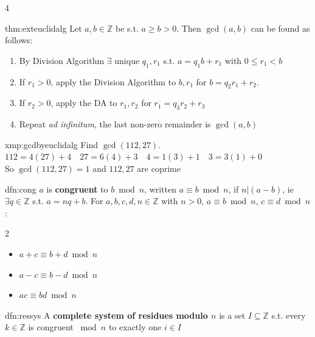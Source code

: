 \documentclass[landscape, 8pt]{extarticle}
\begin{document}
\begin{multicols*}{4}
		
		\begin{thm}{thm:exteuclidalg}{ }
			Let $a, b\in \mathbb{Z}$ be s.t. $a \ge b > 0$. Then $\gcd(a, b)$ can be found as follows:\\
			\begin{enumerate}[label=(\arabic*)]
				\item By Division Algorithm $\exists$ unique $q_1, r_1$ s.t. $a = q_1b + r_1$ with $0 \le r_1 < b$
				\item If $r_1 > 0$, apply the Division Algorithm to $b, r_1$ for $b = q_2 r_1 + r_2$.
				\item If $r_2 > 0$, apply the DA to $r_1, r_2$ for $r_1 = q_3r_2 + r_3$
				\item Repeat \textit{ad infinitum}, the last non-zero remainder is  $\gcd(a, b)$
			\end{enumerate}
			
		\end{thm}
		
		
		\begin{xmp}{xmp:gcdbyeuclidalg}{ }
			Find $\gcd(112, 27)$.\\
			$112 = 4(27) + 4 \quad 27 = 6(4) + 3 \quad 4 = 1(3) + 1 \quad 3 = 3(1) + 0$\\
			So $\gcd(112, 27) = 1$ and $112, 27$ are coprime
			
		\end{xmp}
		
		
		\begin{dfn}[Congruence]{dfn:cong}{ }
			$a$ is \textbf{congruent} to $b \bmod{n}$, written $a \equiv b \bmod{n}$, if $n|(a-b)$, ie $\exists q\in \mathbb{Z}$ s.t. $a = nq + b$.
			For $a, b, c, d, n\in \mathbb{Z}$ with $n > 0$, $a \equiv b \bmod{n}$, $c \equiv d \bmod{n}$:
			\vspace*{-5ex}
			\begin{multicols*}{2}
				\begin{itemize}
					\item $a + c \equiv b + d \bmod{n}$
					\item $a - c \equiv b - d \bmod{n}$
					\item $ac \equiv bd \bmod{n}$
				\end{itemize}
			\end{multicols*}
			
		\end{dfn}
		
		
		\begin{dfn}{dfn:ressys}{ }
			A \textbf{complete system of residues modulo $n$} is a set $I \subseteq \mathbb{Z}$ s.t. every $k\in \mathbb{Z}$ is congruent $\bmod{n}$ to exactly one $i\in I$
			

\end{dfn}
\end{multicols*}
\end{document}
